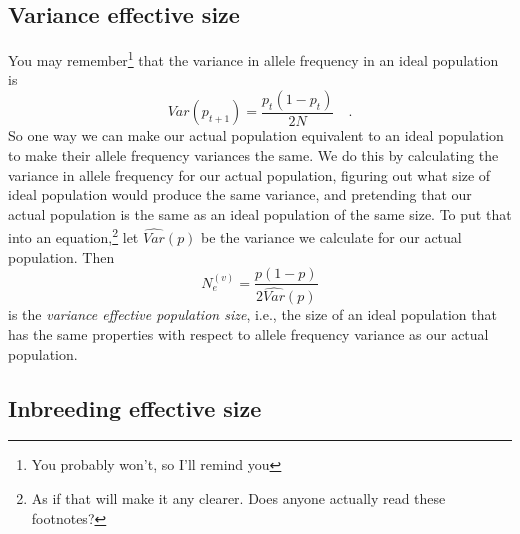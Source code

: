 \documentclass[12pt]{article}
\begin{document}
\subsection*{Variance effective size}

You may remember\footnote{You probably won't, so I'll remind you} that
the variance in allele frequency in an ideal population is
\[
Var(p_{t+1}) = \frac{p_t(1-p_t)}{2N} \quad.
\]
So one way we can make our actual population equivalent to an ideal
population to make their allele frequency variances the same. We do
this by calculating the variance in allele frequency for our actual
population, figuring out what size of ideal population would produce
the same variance, and pretending that our actual population is the
same as an ideal population of the same size. To put that into an
equation,\footnote{As if that will make it any clearer. Does anyone
  actually read these footnotes?} let $\widehat{Var}(p)$ be the
variance we calculate for our actual population. Then
\[
N_e^{(v)} = \frac{p(1-p)}{2\widehat{Var}(p)}
\]
is the {\it variance effective population size}, i.e., the size of an
ideal population that has the same properties with respect to allele
frequency variance as our actual population.

\subsection*{Inbreeding effective size}
\end{document}
